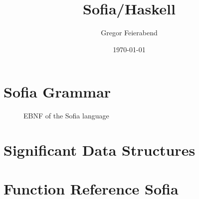 \documentclass[notitlepage]{report}
\title{Sofia/Haskell}
\author{Gregor Feierabend}
\date{\today}
\begin{document}

\maketitle

\begingroup
\let\clearpage\relax
\tableofcontents
\endgroup


\chapter{Sofia Grammar}
\begin{figure}[h!]
	
	\caption{EBNF of the Sofia language}
\end{figure}

\chapter{Significant Data Structures}


\chapter{Function Reference Sofia}

\end{document}
